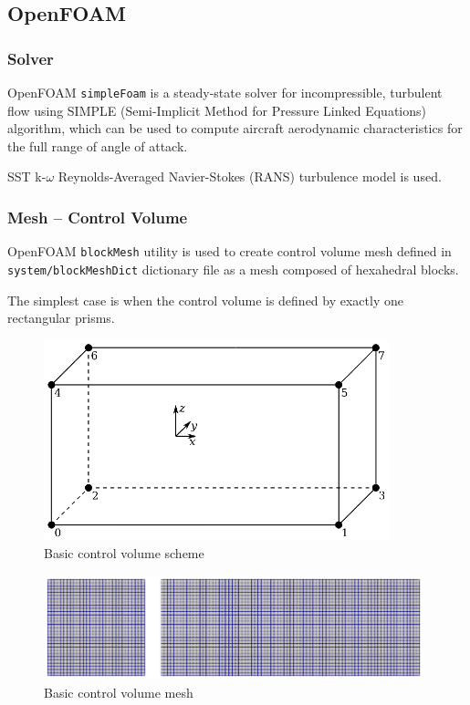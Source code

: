 \subsection{OpenFOAM}

\subsubsection{Solver}

OpenFOAM \texttt{simpleFoam} is a steady-state solver for incompressible, turbulent flow using SIMPLE (Semi-Implicit Method for Pressure Linked Equations) algorithm, which can be used to compute aircraft aerodynamic characteristics for the full range of angle of attack. \cite{Greenshields2018, MoukalledManganiDarwish2016, VersteegMalalasekera2007}

SST k-$\omega$ Reynolds-Averaged Navier-Stokes (RANS) turbulence model is used.

\subsubsection{Mesh -- Control Volume}

OpenFOAM \texttt{blockMesh} utility is used to create control volume mesh defined in \texttt{system/blockMeshDict} dictionary file as a mesh composed of hexahedral blocks.

The simplest case is when the control volume is defined by exactly one rectangular prisms.

\begin{figure}[h!]
  \centering
  \includegraphics[width=100mm]{eps/openfoam_control_volume_1_1.eps}
  \caption{Basic control volume scheme}
\end{figure}

\begin{figure}[h!]
  \centering
  \includegraphics[width=110mm]{eps/openfoam_control_volume_1_1_para.eps}
  \caption{Basic control volume mesh}
\end{figure}

